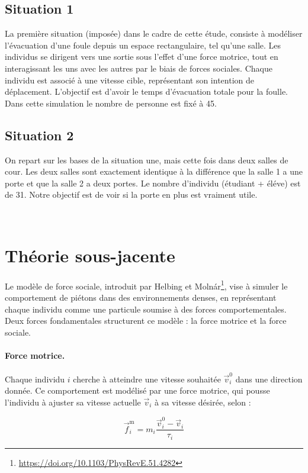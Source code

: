 \documentclass[a4paper,12pt]{article}
\begin{document}
\subsection{Situation 1}
\indent La première situation (imposée) dans le cadre de cette étude, consiste à modéliser l’évacuation d’une foule depuis un espace rectangulaire, tel qu’une salle. Les individus se dirigent vers une sortie sous l'effet d'une force motrice, tout en interagissant les uns avec les autres par le biais de forces sociales. Chaque individu est associé à une vitesse cible, représentant son intention de déplacement. L'objectif est d'avoir le temps d'évacuation totale pour la foulle. Dans cette simulation le nombre de personne est fixé à 45.

\subsection{Situation 2}
\indent On repart sur les bases de la situation une, mais cette fois dans deux salles de cour. Les deux salles sont exactement identique à la différence que la salle 1 a une porte et que la salle 2 a deux portes. Le nombre d'individu (étudiant + éléve) est de 31. Notre objectif est de voir si la porte en plus est vraiment utile.

\
\section{Théorie sous-jacente}

Le modèle de force sociale, introduit par Helbing et Molnár\footnote{\url{https://doi.org/10.1103/PhysRevE.51.4282}}, vise à simuler le comportement de piétons dans des environnements denses, en représentant chaque individu comme une particule soumise à des forces comportementales. Deux forces fondamentales structurent ce modèle : la force motrice et la force sociale.

\paragraph{Force motrice.}
Chaque individu $i$ cherche à atteindre une vitesse souhaitée $\vec{v}_i^0$ dans une direction donnée. Ce comportement est modélisé par une force motrice, qui pousse l'individu à ajuster sa vitesse actuelle $\vec{v}_i$ à sa vitesse désirée, selon :

\begin{equation}
\label{eq:force_motrice}
\vec{f}_i^{\text{m}} = m_i \frac{\vec{v}_i^0 - \vec{v}_i}{\tau_i}
\end{equation}
\end{document}
